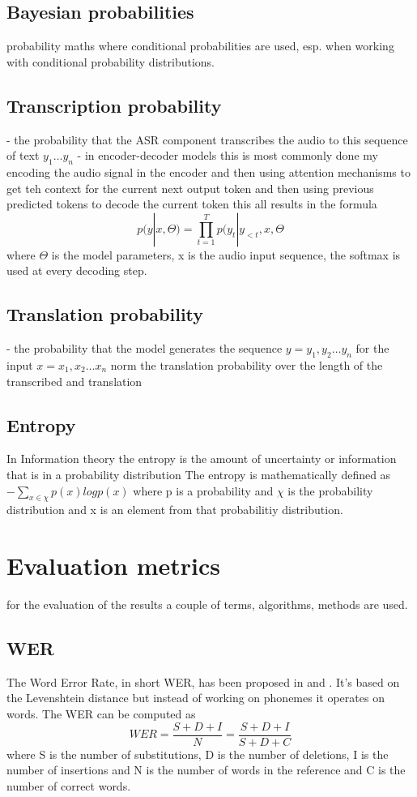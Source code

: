 \subsection{Bayesian probabilities}
probability maths where conditional probabilities are used, esp. when working with conditional probability distributions.


\subsection{Transcription probability}
- the probability that the ASR component transcribes the audio to this sequence of text $y_1\dots y_n$ 
- in encoder-decoder models this is most commonly done my encoding the audio signal in the encoder and then using attention mechanisms to get teh context for the current next output token and then using previous predicted tokens to decode the current token
this all results in the formula $$p(y|x,\Theta)=\prod_{t=1}^T p(y_t|y_{<t}, x, \Theta $$ where $\Theta$ is the model parameters, x is the audio input sequence, the softmax is used at every decoding step.



\subsection{Translation probability}
- the probability that the model generates the sequence $y = y_1, y_2 \dots y_n$ for the input $x=x_1, x_2 \dots x_n$
norm the translation probability over the length of the transcribed and translation 

\subsection{Entropy}
In Information theory the entropy is the amount of uncertainty or information that is in a probability distribution
The entropy is mathematically defined as $- \sum_{x\in \chi} p(x) log p(x)$ where p is a probability and $\chi$ is the probability distribution and x is an element from that probabilitiy distribution.
\section{Evaluation metrics}
 for the evaluation of the results a couple of terms, algorithms, methods are used. 
\subsection{WER}
The Word Error Rate, in short WER, has been proposed in \cite{woodard1982} and \cite{morris2004}.
It's based on the Levenshtein distance but instead of working on phonemes it operates on words.
The WER can be computed as $$WER=\frac{S+D+I}{N}=\frac{S+D+I}{S+D+C}$$ where S is the number of substitutions, D is the number of deletions, I is the number of insertions and N is the number of words in the reference and C is the number of correct words.

